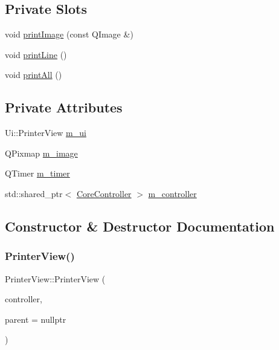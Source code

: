 \subsection*{Private Slots}
\begin{DoxyCompactItemize}
\item 
void \mbox{\hyperlink{class_q_g_b_a_1_1_printer_view_aafb4738a822d711c75f42dc3142e1152}{print\+Image}} (const Q\+Image \&)
\item 
void \mbox{\hyperlink{class_q_g_b_a_1_1_printer_view_a30a8310a3788be585bc9d0dc20a2ea09}{print\+Line}} ()
\item 
void \mbox{\hyperlink{class_q_g_b_a_1_1_printer_view_a194a0d28136e593ada362ba98a2a69a8}{print\+All}} ()
\end{DoxyCompactItemize}
\subsection*{Private Attributes}
\begin{DoxyCompactItemize}
\item 
Ui\+::\+Printer\+View \mbox{\hyperlink{class_q_g_b_a_1_1_printer_view_a6fce1bf6a78af7095cbd473628f49e31}{m\+\_\+ui}}
\item 
Q\+Pixmap \mbox{\hyperlink{class_q_g_b_a_1_1_printer_view_ad302e942fd26791c74010a61a9cc47d9}{m\+\_\+image}}
\item 
Q\+Timer \mbox{\hyperlink{class_q_g_b_a_1_1_printer_view_a7fd5d471303f858fd65fea96433fa7cc}{m\+\_\+timer}}
\item 
std\+::shared\+\_\+ptr$<$ \mbox{\hyperlink{class_q_g_b_a_1_1_core_controller}{Core\+Controller}} $>$ \mbox{\hyperlink{class_q_g_b_a_1_1_printer_view_afedbebc930d1071233dcbaefff7bf35a}{m\+\_\+controller}}
\end{DoxyCompactItemize}


\subsection{Constructor \& Destructor Documentation}
\mbox{\label{class_q_g_b_a_1_1_printer_view_a7145e3fa1fbb7d0d112aad28ee172131}} 
\subsubsection{\texorpdfstring{Printer\+View()}{PrinterView()}}
{\footnotesize\ttfamily Printer\+View\+::\+Printer\+View (\begin{DoxyParamCaption}\item[{std\+::shared\+\_\+ptr$<$ \mbox{\hyperlink{class_q_g_b_a_1_1_core_controller}{Core\+Controller}} $>$}]{controller,  }\item[{Q\+Widget $\ast$}]{parent = {\ttfamily nullptr} }\end{DoxyParamCaption})}

